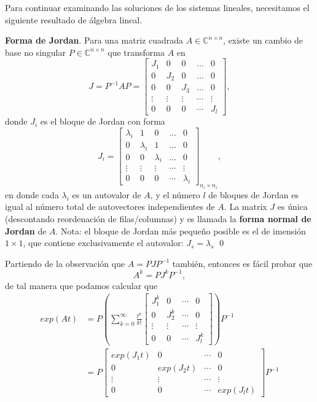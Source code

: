 Para continuar examinando las soluciones de los sistemas lineales, necesitamos el siguiente resultado de álgebra lineal.
\begin{theorem}
\textbf{Forma de Jordan}. Para una matriz cuadrada $A\in\mathbb{C}^{n \times n}$, existe un cambio de base no singular $P\in\mathbb{C}^{n \times n}$ que transforma $A$ en
\begin{equation}
	J = P^{-1}AP = \begin{bmatrix}
		J_1 & 0 & 0 & \dots & 0 \\
		0 & J_2 & 0 & \dots & 0 \\
		0 & 0 & J_3 & \dots & 0 \\
		\vdots & \vdots & \vdots & \cdots & \vdots \\
		0 & 0 & 0 & \cdots & J_l
	\end{bmatrix},
\end{equation}
donde $J_i$ es el bloque de Jordan con forma
	\begin{equation}
	J_i = \begin{bmatrix}
\lambda_i & 1 & 0 & \dots & 0 \\
		0 & \lambda_i & 1 & \dots & 0 \\
		0 & 0 & \lambda_i & \dots & 0 \\
		\vdots & \vdots & \vdots & \cdots & \vdots \\
		0 & 0 & 0 & \cdots & \lambda_i
	\end{bmatrix}_{n_i\times n_i},
	\end{equation}
	en donde cada $\lambda_i$ es un autovalor de $A$, y el número $l$ de bloques de Jordan es igual al número total de autovectores independientes de $A$. La matrix $J$ es única (descontando reordenación de filas/columnas) y es llamada la \textbf{forma normal de Jordan} de $A$. Nota: el bloque de Jordan más pequeño posible es el de imensión $1\times 1$, que contiene exclusivamente el autovalor: $J_s = \lambda_s$
	\qed
\end{theorem}

Partiendo de la observación que $A = PJP^{-1}$ también, entonces es fácil probar que 
\begin{equation}
	A^k = PJ^kP^{-1},
\end{equation}
de tal manera que podamos calcular que
\begin{align}
	exp(At) &= P\left(\sum_{k=0}^\infty \frac{t^k}{k!} \begin{bmatrix}J_1^k & 0 & \cdots & 0 \\ 0 & J_2^k & \cdots & 0 \\ \vdots & \vdots & \cdots & \vdots \\ 0 & 0 & \cdots & J_l^k \end{bmatrix} \right) P^{-1} \nonumber \\
		&= P \begin{bmatrix}exp(J_1t) & 0 & \cdots & 0 \\ 0 & exp(J_2t) & \cdots & 0 \\ \vdots & \vdots & \cdots & \vdots \\ 0 & 0 & \cdots & exp(J_lt) \end{bmatrix} P^{-1}
\label{eq: expAJordan}
\end{align}

